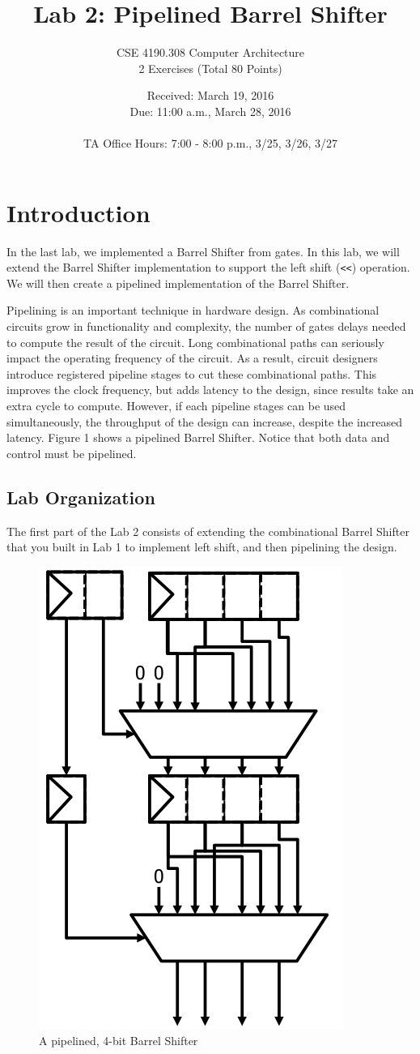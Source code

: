 \documentclass{article}
\begin{document}
\title{Lab 2: Pipelined Barrel Shifter}   %
\author{CSE 4190.308 Computer Architecture \\ 2 Exercises (Total 80 Points)}
\date{Received: March 19, 2016 \\Due: 11:00 a.m., March 28, 2016\\ \ \\ TA Office Hours: 7:00 - 8:00 p.m., 3/25, 3/26, 3/27} 
\maketitle

\section{Introduction}
In the last lab, we implemented a Barrel Shifter from gates. 
In this lab, we will extend the Barrel Shifter implementation to support the left shift (\texttt{<<}) operation. 
We will then create a pipelined implementation of the Barrel Shifter.

Pipelining is an important technique in hardware design. 
As combinational circuits grow in functionality and complexity, 
the number of gates delays needed to compute the result of the circuit.
Long combinational paths can seriously impact the operating frequency of the circuit. 
As a result, circuit designers introduce registered pipeline stages to cut these combinational paths. 
This improves the clock frequency, but adds latency to the design, since results take an extra cycle to compute.
However, if each pipeline stages can be used simultaneously, the throughput of the design can increase, despite the increased latency.
Figure 1 shows a pipelined Barrel Shifter. Notice that both data and control must be pipelined.

\subsection{Lab Organization}
The first part of the Lab 2 consists of extending the combinational Barrel Shifter 
that you built in Lab 1 to implement left shift, and then pipelining the design.

\begin{figure}[hb]
	\centering
	\includegraphics[width=0.3\linewidth]{pipeBS.png}
	\caption{A pipelined, 4-bit Barrel Shifter}
	\label{fig:pipelined_brs}
\end{figure}
\end{document}
